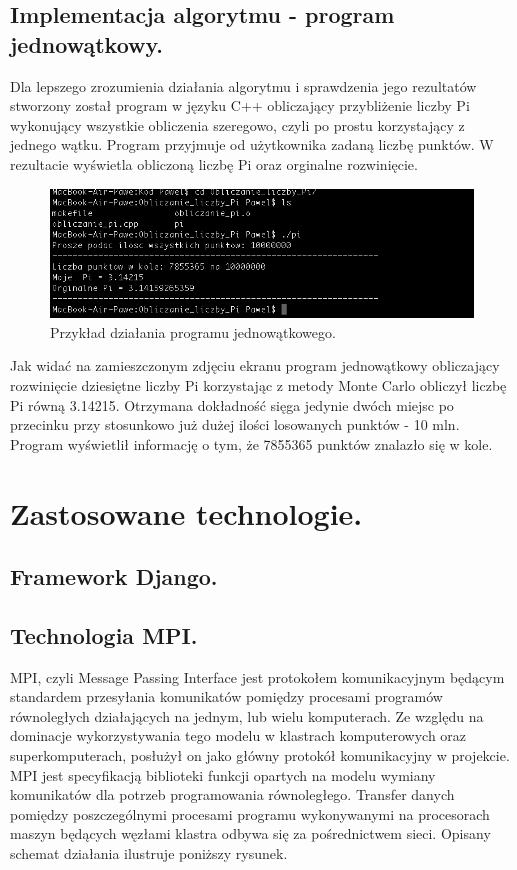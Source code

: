 \documentclass[a4paper,12pt]{article}		%
\begin{document}
\subsection{Implementacja algorytmu - program jednowątkowy.} 
Dla lepszego zrozumienia działania algorytmu i sprawdzenia jego rezultatów stworzony został program w języku C++ obliczający przybliżenie liczby Pi wykonujący wszystkie obliczenia szeregowo, czyli po prostu korzystający z jednego wątku. Program przyjmuje od użytkownika zadaną liczbę punktów. W rezultacie wyświetla obliczoną liczbę Pi oraz orginalne rozwinięcie.

\begin{figure}[h!]
\centering
\includegraphics[scale=0.6]{Resources/Screen_Program_JedenWatek}
\caption{Przykład działania programu jednowątkowego.} 
\end{figure}
Jak widać na zamieszczonym zdjęciu ekranu program jednowątkowy obliczający rozwinięcie dziesiętne liczby Pi korzystając z metody Monte Carlo obliczył liczbę Pi równą 3.14215. Otrzymana dokładność sięga jedynie dwóch miejsc po przecinku przy stosunkowo już dużej ilości losowanych punktów - 10 mln. Program wyświetlił informację o tym, że 7855365 punktów znalazło się w kole.
\section{Zastosowane technologie.}
\subsection{Framework Django.}
\subsection{Technologia MPI.}
MPI, czyli Message Passing Interface jest protokołem komunikacyjnym będącym standardem przesyłania komunikatów pomiędzy procesami programów równoległych działających na jednym, lub wielu komputerach. Ze względu na dominacje wykorzystywania tego modelu w klastrach komputerowych oraz superkomputerach, posłużył on jako główny protokół komunikacyjny w projekcie.
MPI jest specyfikacją biblioteki funkcji opartych na modelu wymiany komunikatów dla potrzeb programowania równoległego. Transfer danych pomiędzy poszczególnymi procesami programu wykonywanymi na procesorach maszyn będących węzłami klastra odbywa się za pośrednictwem sieci. Opisany schemat działania ilustruje poniższy rysunek.
\end{document}
